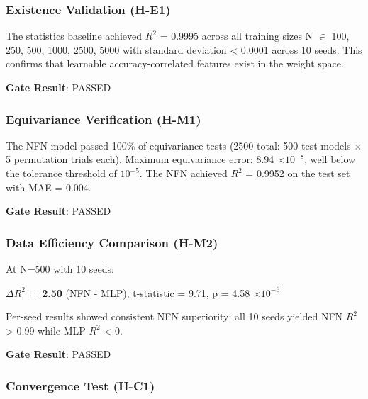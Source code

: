 
\subsubsection{Existence Validation (H-E1)}

The statistics baseline achieved $R^2$ = 0.9995 across all training sizes N $\in$ {100, 250, 500, 1000, 2500, 5000} with standard deviation < 0.0001 across 10 seeds. This confirms that learnable accuracy-correlated features exist in the weight space.

\textbf{Gate Result}: PASSED

\subsubsection{Equivariance Verification (H-M1)}

The NFN model passed 100\% of equivariance tests (2500 total: 500 test models $\times$ 5 permutation trials each). Maximum equivariance error: 8.94 $\times 10^{-8}$, well below the tolerance threshold of $10^{-5}$. The NFN achieved $R^2$ = 0.9952 on the test set with MAE = 0.004.

\textbf{Gate Result}: PASSED

\subsubsection{Data Efficiency Comparison (H-M2)}

At N=500 with 10 seeds:

\begin{table}[htbp]
\centering
{}
\end{table}

\textbf{$\Delta R^2$ = 2.50} (NFN - MLP), t-statistic = 9.71, p = 4.58 $\times 10^{-6}$

Per-seed results showed consistent NFN superiority: all 10 seeds yielded NFN $R^2$ > 0.99 while MLP $R^2$ < 0.

\textbf{Gate Result}: PASSED

\subsubsection{Convergence Test (H-C1)}


